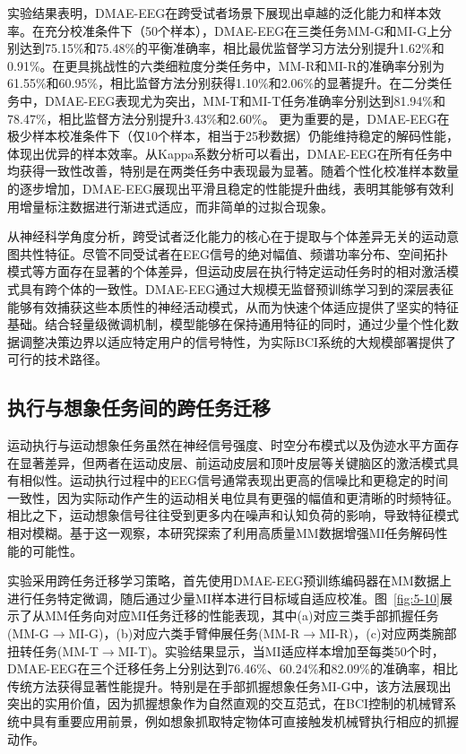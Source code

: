 实验结果表明，DMAE-EEG在跨受试者场景下展现出卓越的泛化能力和样本效率。在充分校准条件下（50个样本），DMAE-EEG在三类任务MM-G和MI-G上分别达到75.15\%和75.48\%的平衡准确率，相比最优监督学习方法分别提升1.62\%和0.91\%。在更具挑战性的六类细粒度分类任务中，MM-R和MI-R的准确率分别为61.55\%和60.95\%，相比监督方法分别获得1.10\%和2.06\%的显著提升。在二分类任务中，DMAE-EEG表现尤为突出，MM-T和MI-T任务准确率分别达到81.94\%和78.47\%，相比监督方法分别提升3.43\%和2.60\%。
更为重要的是，DMAE-EEG在极少样本校准条件下（仅10个样本，相当于25秒数据）仍能维持稳定的解码性能，体现出优异的样本效率。从Kappa系数分析可以看出，DMAE-EEG在所有任务中均获得一致性改善，特别是在两类任务中表现最为显著。随着个性化校准样本数量的逐步增加，DMAE-EEG展现出平滑且稳定的性能提升曲线，表明其能够有效利用增量标注数据进行渐进式适应，而非简单的过拟合现象。

从神经科学角度分析，跨受试者泛化能力的核心在于提取与个体差异无关的运动意图共性特征。尽管不同受试者在EEG信号的绝对幅值、频谱功率分布、空间拓扑模式等方面存在显著的个体差异，但运动皮层在执行特定运动任务时的相对激活模式具有跨个体的一致性。DMAE-EEG通过大规模无监督预训练学习到的深层表征能够有效捕获这些本质性的神经活动模式，从而为快速个体适应提供了坚实的特征基础。结合轻量级微调机制，模型能够在保持通用特征的同时，通过少量个性化数据调整决策边界以适应特定用户的信号特性，为实际BCI系统的大规模部署提供了可行的技术路径。

\subsection{执行与想象任务间的跨任务迁移}
运动执行与运动想象任务虽然在神经信号强度、时空分布模式以及伪迹水平方面存在显著差异，但两者在运动皮层、前运动皮层和顶叶皮层等关键脑区的激活模式具有相似性。运动执行过程中的EEG信号通常表现出更高的信噪比和更稳定的时间一致性，因为实际动作产生的运动相关电位具有更强的幅值和更清晰的时频特征。相比之下，运动想象信号往往受到更多内在噪声和认知负荷的影响，导致特征模式相对模糊。基于这一观察，本研究探索了利用高质量MM数据增强MI任务解码性能的可能性。

实验采用跨任务迁移学习策略，首先使用DMAE-EEG预训练编码器在MM数据上进行任务特定微调，随后通过少量MI样本进行目标域自适应校准。图~\ref{fig:5-10}展示了从MM任务向对应MI任务迁移的性能表现，其中(a)对应三类手部抓握任务(MM-G$\rightarrow$MI-G)，(b)对应六类手臂伸展任务(MM-R$\rightarrow$MI-R)，(c)对应两类腕部扭转任务(MM-T$\rightarrow$MI-T)。实验结果显示，当MI适应样本增加至每类50个时，DMAE-EEG在三个迁移任务上分别达到76.46\%、60.24\%和82.09\%的准确率，相比传统方法获得显著性能提升。特别是在手部抓握想象任务MI-G中，该方法展现出突出的实用价值，因为抓握想象作为自然直观的交互范式，在BCI控制的机械臂系统中具有重要应用前景，例如想象抓取特定物体可直接触发机械臂执行相应的抓握动作。


